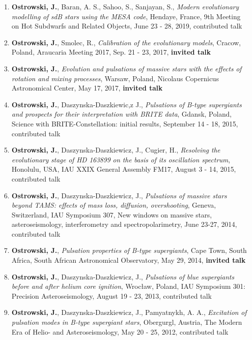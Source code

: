 \documentclass[margin, 10pt]{res} %
\begin{document}
\begin{resume}
\begin{enumerate}
    \item \textbf{Ostrowski, J.}, Baran, A. S., Sahoo, S., Sanjayan, S., \textit{Modern evolutionary modelling of sdB stars using the MESA code}, Hendaye, France, 9th Meeting on Hot Subdwarfs and Related Objects, June 23 - 28, 2019, contributed talk

    \item \textbf{Ostrowski, J.}, Smolec, R., \textit{Calibration of the evolutionary models}, Cracow, Poland, Araucaria Meeting 2017, Sep. 21 - 23, 2017, \textbf{invited talk}

    \item \textbf{Ostrowski, J.}, \textit{Evolution and pulsations of massive stars with the effects of rotation and mixing processes}, Warsaw, Poland, Nicolaus Copernicus Astronomical Center, May 17, 2017, \textbf{invited talk}

    \item \textbf{Ostrowski, J.}, Daszynska-Daszkiewic,z J., \textit{Pulsations of B-type supergiants and prospects for their interpretation with BRITE data}, Gdansk, Poland,  Science with BRITE-Constellation: initial results, September 14 - 18, 2015, contributed talk
     
    \item \textbf{Ostrowski, J.}, Daszynska-Daszkiewicz, J., Cugier, H., \textit{Resolving the evolutionary stage of HD 163899 on the basis of its oscillation spectrum}, Honolulu, USA, IAU XXIX General Assembly FM17, August 3 - 14, 2015, contributed talk

    \item \textbf{Ostrowski, J.}, Daszynska-Daszkiewicz, J., \textit{Pulsations of massive stars beyond TAMS: effects of mass loss, diffusion, overshooting}, Geneva, Switzerland, IAU Symposium 307, New windows on massive stars, asteroseismology, interferometry and spectropolarimetry, June 23-27, 2014, contributed talk

    \item \textbf{Ostrowski, J.}, \textit{Pulsation properties of B-type supergiants}, Cape Town, South Africa, South African Astronomical Observatory, May 29, 2014, \textbf{invited talk}

    \item \textbf{Ostrowski, J.}, Daszynska-Daszkiewicz, J., \textit{Pulsations of blue supergiants before and after helium core ignition}, Wroc\l{}aw, Poland, IAU Symposium 301: Precision Asteroseismology, August 19 - 23, 2013, contributed talk

    \item \textbf{Ostrowski, J.}, Daszynska-Daszkiewicz, J., Pamyatnykh, A. A., \textit{Excitation of pulsation modes in B-type supergiant stars}, Obergurgl, Austria, The Modern Era of Helio- and Asteroseismology, May 20 - 25, 2012, contributed talk
\end{enumerate}


\end{resume}
\end{document}
